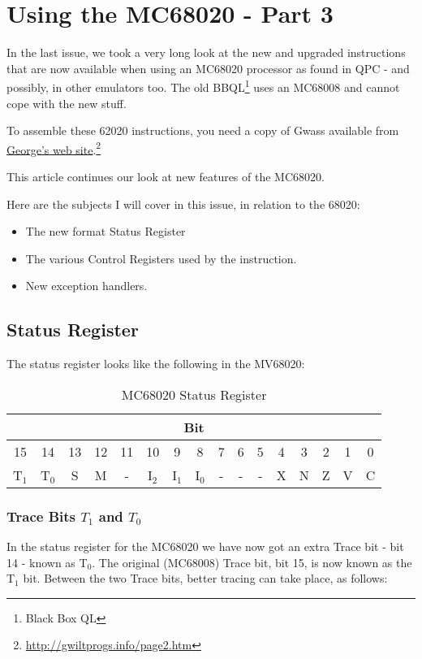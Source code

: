 \chapter{Using the MC68020 - Part 3}

In the last issue, we took a very long look at the new and upgraded instructions that are now available when using an MC68020 processor as found in QPC - and possibly, in other emulators too. The old BBQL\footnote{Black Box QL} uses an MC68008 and cannot cope with the new stuff.

To assemble these 62020 instructions, you need a copy of Gwass available from \href{http://gwiltprogs.info/page2.htm}{George's web site}.\footnote{\url{http://gwiltprogs.info/page2.htm}}

This article continues our look at new features of the MC68020.

Here are the subjects I will cover in this issue, in relation to the 68020:

\begin{itemize}
	\item The new format Status Register
	\item The various Control Registers used by the  instruction.
	\item New exception handlers.
\end{itemize}

\section{Status Register}

The status register looks like the following in the MV68020:

\begin{table}[h]
	\centering
	\begin{tabular}{|c|c|c|c|c|c|c|c|c|c|c|c|c|c|c|c|}
		\toprule
		\multicolumn{16}{|c|}{Bit}\\
		\midrule
		15     &14     &13&12&11&10     &9      &8      &7&6&5&4&3&2&1&0\\
		\midrule
		T$_{1}$&T$_{0}$&S &M &- &I$_{2}$&I$_{1}$&I$_{0}$&-&-&-&X&N&Z&V&C\\
		\bottomrule
	\end{tabular}
	\caption{MC68020 Status Register}
	\label{tab-MCCR}
\end{table}

\subsection{Trace Bits $T_{1}$ and $T_{0}$}
In the status register for the MC68020 we have now got an extra Trace bit - bit 14 - known as T$_{0}$. The original (MC68008) Trace bit, bit 15, is now known as the T$_{1}$ bit. Between the two Trace bits, better tracing can take place, as follows:

